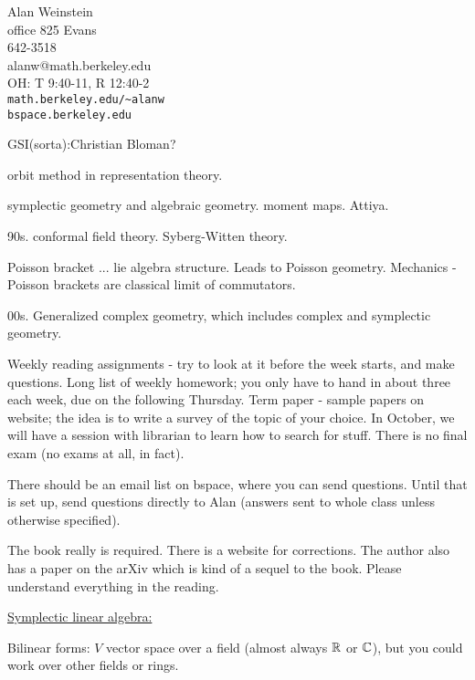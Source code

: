  \setcounter{lecture}{1}

 \noindent Alan Weinstein\\
 office 825 Evans\\
 642-3518\\
 alanw@math.berkeley.edu\\
 OH: T 9:40-11, R 12:40-2\\
 \texttt{math.berkeley.edu/\~{}alanw}\\
 \texttt{bspace.berkeley.edu}

 \noindent GSI(sorta):Christian Bloman?

 orbit method in representation theory.

 symplectic geometry and algebraic geometry.  moment maps.
 Attiya.

 90s. conformal field theory.  Syberg-Witten theory.

 Poisson bracket ... lie algebra structure.  Leads to Poisson
 geometry.  Mechanics - Poisson brackets are classical limit of
 commutators.

 00s. Generalized complex geometry, which includes complex and
 symplectic geometry.

 \vspace{5mm}

 Weekly reading assignments - try to look at it before the week
 starts, and make questions.  Long list of weekly homework; you
 only have to hand in about three each week, due on the following
 Thursday.  Term paper - sample papers on website; the idea is to
 write a survey of the topic of your choice.  In October, we will
 have a session with librarian to learn how to search for stuff.  There
 is no final exam (no exams at all, in fact).

 There should be an email list on bspace, where you can send
 questions.  Until that is set up, send questions directly to Alan
 (answers sent to whole class unless otherwise specified).

 The book really is required.  There is a website for corrections.
 The author also has a paper on the arXiv which is kind of a
 sequel to the book. Please understand everything in the reading.

\vspace{5mm}

 \underline{Symplectic linear algebra:}

 Bilinear forms: $V$ vector space over a field (almost always $\mathbb{R}$
 or $\mathbb{C}$), but you could work over other fields or rings.

